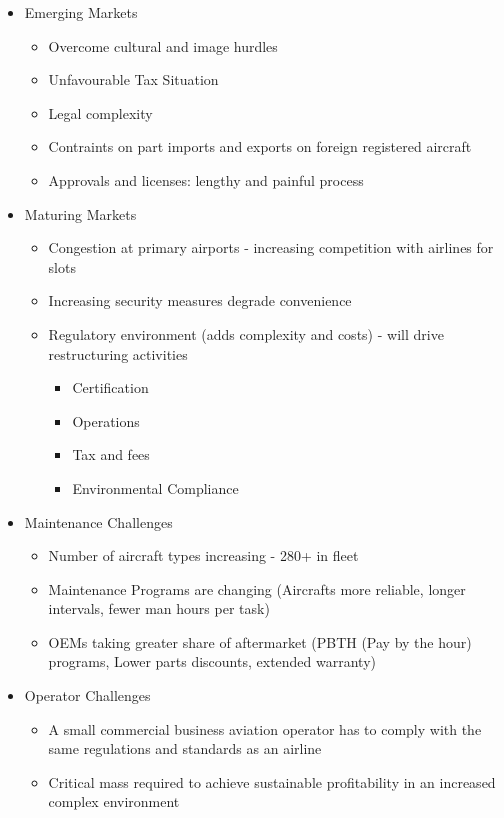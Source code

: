 \documentclass[9pt, landscape, fleqn]{scrartcl}
\begin{document}
\begin{multicols*}{3}
\begin{itemize}
    \item Emerging Markets 
    \begin{itemize}
        \item Overcome cultural and image hurdles 
        \item Unfavourable Tax Situation 
        \item Legal complexity 
        \item Contraints on part imports and exports on foreign registered aircraft 
        \item Approvals and licenses: lengthy and painful process 
    \end{itemize}
    \item Maturing Markets 
    \begin{itemize}
        \item Congestion at primary airports - increasing competition with airlines for slots 
        \item Increasing security measures degrade convenience 
        \item Regulatory environment (adds complexity and costs) - will drive restructuring activities 
        \begin{itemize}
            \item Certification 
            \item Operations 
            \item Tax and fees 
            \item Environmental Compliance 
        \end{itemize}
    \end{itemize}    
    \item Maintenance Challenges
    \begin{itemize}
        \item Number of aircraft types increasing - 280+ in fleet 
        \item Maintenance Programs are changing (Aircrafts more reliable, longer intervals, fewer man hours per task)
        \item OEMs taking greater share of aftermarket (PBTH (Pay by the hour) programs, Lower parts discounts, extended warranty)
    \end{itemize}
    \item Operator Challenges 
    \begin{itemize}
        \item A small commercial business aviation operator has to comply with the same regulations and standards as an airline
        \item Critical mass required to achieve sustainable profitability in an increased complex environment

\end{itemize}
\end{itemize}
\end{multicols*}
\end{document}
